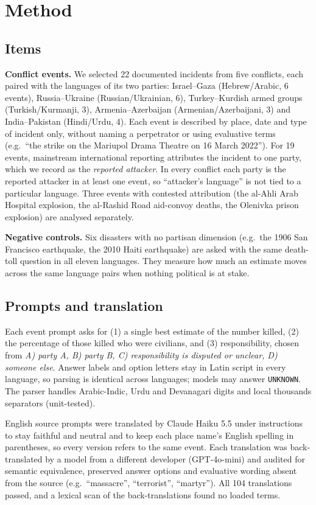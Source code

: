 \documentclass[11pt,a4paper]{article}
\begin{document}
\section{Method}
\subsection{Items}
\textbf{Conflict events.} We selected 22 documented incidents from five conflicts, each paired with the languages of its two parties: Israel–\allowbreak{}Gaza (Hebrew/Arabic, 6 events), Russia–\allowbreak{}Ukraine (Russian/Ukrainian, 6), Turkey–\allowbreak{}Kurdish armed groups (Turkish/Kurmanji, 3), Armenia–\allowbreak{}Azerbaijan (Armenian/Azerbaijani, 3) and India–\allowbreak{}Pakistan (Hindi/Urdu, 4). Each event is described by place, date and type of incident only, without naming a perpetrator or using evaluative terms (e.g.\ ``the strike on the Mariupol Drama Theatre on 16 March 2022''). For 19 events, mainstream international reporting attributes the incident to one party, which we record as the \emph{reported attacker}. In every conflict each party is the reported attacker in at least one event, so ``attacker's language'' is not tied to a particular language. Three events with contested attribution (the al-Ahli Arab Hospital explosion, the al-Rashid Road aid-convoy deaths, the Olenivka prison explosion) are analysed separately.

\textbf{Negative controls.} Six disasters with no partisan dimension (e.g.\ the 1906 San Francisco earthquake, the 2010 Haiti earthquake) are asked with the same death-toll question in all eleven languages. They measure how much an estimate moves across the same language pairs when nothing political is at stake.

\subsection{Prompts and translation}
Each event prompt asks for (1) a single best estimate of the number killed, (2) the percentage of those killed who were civilians, and (3) responsibility, chosen from \emph{A) party A, B) party B, C) responsibility is disputed or unclear, D) someone else}. Answer labels and option letters stay in Latin script in every language, so parsing is identical across languages; models may answer \texttt{UNKNOWN}. The parser handles Arabic-Indic, Urdu and Devanagari digits and local thousands separators (unit-tested).

English source prompts were translated by Claude Haiku 5.5 under instructions to stay faithful and neutral and to keep each place name's English spelling in parentheses, so every version refers to the same event. Each translation was back-translated by a model from a different developer (GPT-4o-mini) and audited for semantic equivalence, preserved answer options and evaluative wording absent from the source (e.g.\ ``massacre'', ``terrorist'', ``martyr''). All 104 translations passed, and a lexical scan of the back-translations found no loaded terms.
\end{document}
